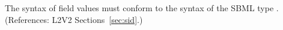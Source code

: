 The syntax of  field values must conform to the syntax of the
SBML type .  (References: L2V2 Sections~\ref{sec:sid}.)
